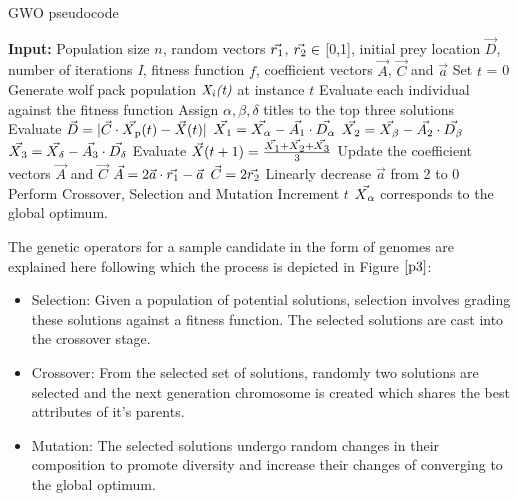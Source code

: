\documentclass[conference]{IEEEtran}
\begin{document}
\begin{algorithm}[t]
\footnotesize
\caption{GWO pseudocode}
\label{alg:gwo}
\begin{algorithmic}[1]
\STATE \textbf{Input:} Population size $\textit{n}$, random vectors $\vec{r\textsubscript{1}}$, $\vec{r\textsubscript{2}} \in$ [0,1], initial prey location $\vec{D}$, number of iterations \textit{I}, fitness function $\textit{f}$, coefficient vectors $\vec{A}$, $\vec{C}$ and $\vec{a}$
\STATE Set $\textit{t}$ = 0
\STATE Generate wolf pack population $\textit{X\textsubscript{i}(t)}$ at instance $\textit{t}$
\STATE Evaluate each individual against the fitness function
\ENDFOR
\STATE Assign $\alpha, \beta, \delta$ titles to the top three solutions
\STATE Evaluate $\vec{D} = |\vec{C} \cdot \vec{X\textsubscript{p}}(t) - \vec{X}(t)|$
\STATE $\vec{X\textsubscript{1}} = \vec{X\textsubscript{$\alpha$}} - \vec{A\textsubscript{1}} \cdot  \vec{D\textsubscript{$\alpha$}}$
\STATE $\vec{X\textsubscript{2}} = \vec{X\textsubscript{$\beta$}} - \vec{A\textsubscript{2}} \cdot  \vec{D\textsubscript{$\beta$}}$
\STATE $\vec{X\textsubscript{3}} = \vec{X\textsubscript{$\delta$}} - \vec{A\textsubscript{3}} \cdot  \vec{D\textsubscript{$\delta$}}$
\STATE Evaluate $\vec{X}(t+1) = \frac{\vec{X\textsubscript{1}} + \vec{X\textsubscript{2}} + \vec{X\textsubscript{3}}}{3}$
\ENDFOR
\STATE Update the coefficient vectors $\vec{A}$ and $\vec{C}$
\STATE $\vec{A} = 2\vec{a} \cdot \vec{r\textsubscript{1}} - \vec{a}$
\STATE $\vec{C} = 2\vec{r\textsubscript{2}}$
\STATE Linearly decrease $\vec{a}$ from 2 to 0
\STATE Perform Crossover, Selection and Mutation
\STATE Increment $\textit{t}$
\ENDFOR
\STATE $\vec{X\textsubscript{$\alpha$}}$ corresponds to the global optimum. 
\end{algorithmic}
\end{algorithm}
The genetic operators for a sample candidate in the form of genomes are explained here following which the process is depicted in Figure $\ref{p3}$:
\begin{itemize}
\item Selection: Given a population of potential solutions, selection involves grading these solutions against a fitness function. The selected solutions are cast into the crossover stage.
\item Crossover: From the selected set of solutions, randomly two solutions are selected and the next generation chromosome is created which shares the best attributes of it's parents.
\item Mutation: The selected solutions undergo random changes in their composition to promote diversity and increase their changes of converging to the global optimum.
\end{itemize}
\end{document}
